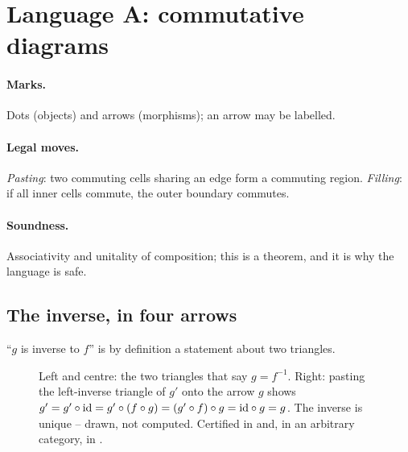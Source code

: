 \section{Language A: commutative diagrams}
\label{sec:catdiag}

\paragraph{Marks.} Dots (objects) and arrows (morphisms); an arrow may be labelled.
\paragraph{Legal moves.} \emph{Pasting}: two commuting cells sharing an edge form a
commuting region. \emph{Filling}: if all inner cells commute, the outer boundary commutes.
\paragraph{Soundness.} Associativity and unitality of composition; this is a theorem, and
it is why the language is safe.

\subsection{The inverse, in four arrows}

``$g$ is inverse to $f$'' is by definition a statement about two triangles.

\begin{figure}[H]
\centering
{}
\qquad
{}
\qquad
{}
\caption{Left and centre: the two triangles that say $g=f^{-1}$. Right: pasting the
left-inverse triangle of $g'$ onto the arrow $g$ shows $g'=g'\circ\mathrm{id}=g'\circ(f\circ g)
=(g'\circ f)\circ g=\mathrm{id}\circ g=g$. The inverse is unique -- drawn, not computed.
Certified in  and, in an arbitrary category, in
.}
\label{fig:invunique}
\end{figure}

